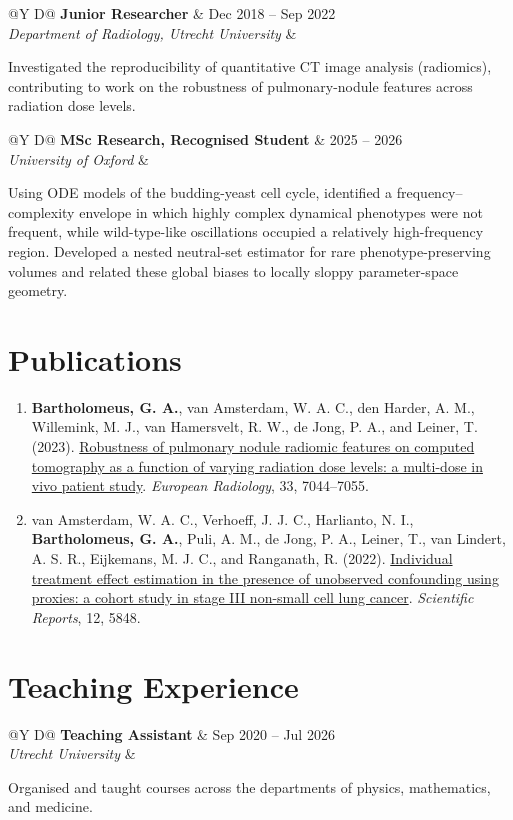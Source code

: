 \documentclass[10pt,a4paper]{article}
\makeatletter
\newcommand{\cvitem}[4]{%
  \begin{tabularx}{\textwidth}{@{}Y D@{}}
    \textbf{#1} & #2 \\
    \textit{#3} & \\
  \end{tabularx}
  \vspace{1pt}#4\par\vspace{5pt}
}
\makeatother
\begin{document}
\cvitem{Junior Researcher}{Dec 2018 -- Sep 2022}
  {Department of Radiology, Utrecht University}
  {Investigated the reproducibility of quantitative CT image analysis (radiomics), contributing to work on the robustness of pulmonary-nodule features across radiation dose levels.}

\cvitem{MSc Research, Recognised Student}{2025 -- 2026}
  {University of Oxford}
  {Using ODE models of the budding-yeast cell cycle, identified a frequency--complexity envelope in which highly complex dynamical phenotypes were not frequent, while wild-type-like oscillations occupied a relatively high-frequency region. Developed a nested neutral-set estimator for rare phenotype-preserving volumes and related these global biases to locally sloppy parameter-space geometry.}

\newpage

\section{Publications}

\begin{enumerate}[leftmargin=5mm,label={\arabic*.},itemsep=5pt,topsep=1pt]
  \item \textbf{Bartholomeus, G. A.}, van Amsterdam, W. A. C., den Harder, A. M., Willemink, M. J., van Hamersvelt, R. W., de Jong, P. A., and Leiner, T. (2023). \href{https://doi.org/10.1007/s00330-023-09643-8}{Robustness of pulmonary nodule radiomic features on computed tomography as a function of varying radiation dose levels: a multi-dose in vivo patient study}. \textit{European Radiology}, 33, 7044--7055.
  \item van Amsterdam, W. A. C., Verhoeff, J. J. C., Harlianto, N. I., \textbf{Bartholomeus, G. A.}, Puli, A. M., de Jong, P. A., Leiner, T., van Lindert, A. S. R., Eijkemans, M. J. C., and Ranganath, R. (2022). \href{https://doi.org/10.1038/s41598-022-09775-9}{Individual treatment effect estimation in the presence of unobserved confounding using proxies: a cohort study in stage III non-small cell lung cancer}. \textit{Scientific Reports}, 12, 5848.
\end{enumerate}

\section{Teaching Experience}

\cvitem{Teaching Assistant}{Sep 2020 -- Jul 2026}
  {Utrecht University}
  {Organised and taught courses across the departments of physics, mathematics, and medicine.}
\end{document}
